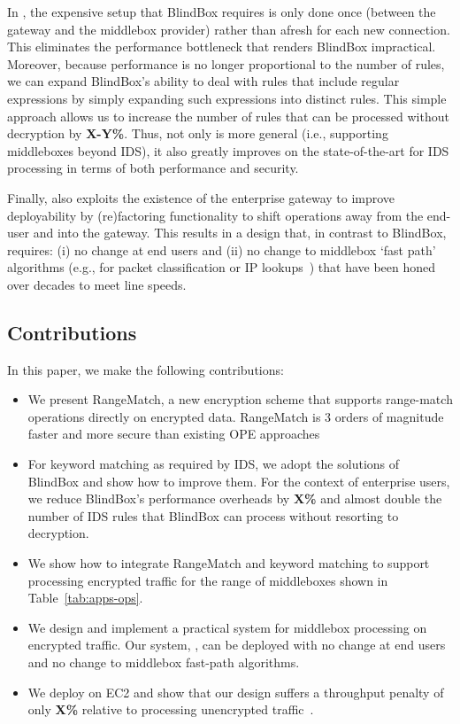 In \sys, the expensive setup that BlindBox requires is only done once (between the gateway and the middlebox provider) rather 
than afresh for each new connection. This eliminates the performance bottleneck that renders BlindBox impractical. 
Moreover, because performance is no longer proportional to the number of rules, we can expand BlindBox's ability to deal with   
rules that include regular expressions by simply expanding such expressions into distinct rules. This simple approach allows us 
 to increase the number of rules that can be processed without decryption by {\bf X-Y\%}. Thus, not only is \sys more 
general (i.e., supporting middleboxes beyond IDS), it also greatly improves on the state-of-the-art for IDS processing in terms 
of both performance and security. 

Finally, \sys also exploits the existence of the enterprise gateway to improve deployability by (re)factoring functionality to shift 
operations away from the end-user and into the gateway. This results in a design that, in contrast to BlindBox, requires: (i) no 
change at end users and (ii) no change to middlebox `fast path' algorithms (e.g., for packet classification or IP lookups~\cite{varghese, mckeown, long, list}) 
that have been honed over decades to meet line speeds. 


\subsection{Contributions}
\label{sec:contributions}

In this paper, we make the following contributions: 

\begin{itemize} 
\item We present RangeMatch, a new encryption scheme that supports range-match operations directly on encrypted data. RangeMatch is 
3 orders of magnitude faster and more secure than existing OPE approaches
\item For keyword matching as required by IDS, we adopt the solutions of BlindBox and show how to improve them. For the context of enterprise 
users, we reduce BlindBox's performance overheads by {\bf X\%} and almost double the number of IDS rules that BlindBox can process without resorting 
to decryption. 
\item We show how to integrate RangeMatch and keyword matching to support processing encrypted traffic for the 
range of middleboxes shown in Table~\ref{tab:apps-ops}. 
\item We design and implement a practical system for middlebox processing on encrypted traffic. Our system, \sys,   
can be deployed with no change at end users and no change to middlebox fast-path algorithms. 
\vspace{-0.4em}
\item We deploy \sys on EC2 and show that our design suffers a throughput penalty of only {\bf X\%} relative to processing unencrypted 
traffic~\cite{aplomb}.  
\vspace{-0.4em}
\end{itemize} 

